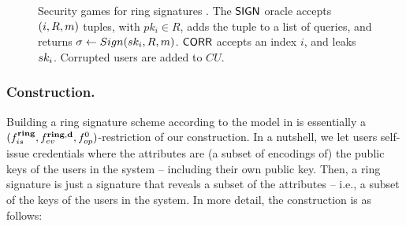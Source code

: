 \begin{figure}[ht!]
  \centering
  \caption{Security games for ring signatures \cite{bkm06}. The $\mathsf{SIGN}$
    oracle accepts $(i,R,m)$ tuples, with $pk_i \in R$, adds the tuple to a
    list of queries, and returns $\sigma \gets Sign(sk_i,R,m)$.
    $\mathsf{CORR}$ accepts an index $i$, and leaks $sk_i$. Corrupted users are
    added to $CU$.}
  \label{fig:model-rs}  
\end{figure}


\subsubsection{\CUASRing Construction.} %
Building a ring signature scheme according to the model in 
is essentially a $(f_{is}^{\mathbf{ring}},f_{ev}^{\mathbf{ring},\mathbf{d}},f_{op}^0)$-restriction
of our \CUASGenHideIss construction. In a nutshell, we let users self-issue
credentials where the attributes are (a subset of encodings of) the public keys
of the users in the system -- including their own public key. Then, a ring
signature is just a \CUASGenHideIss signature that reveals a subset of
the attributes -- i.e., a subset of the keys of the users in the system. In more
detail, the construction is as follows:

